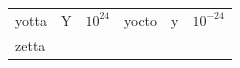 {\begin{tabular}[t]{|l|l|l|l|l|l|}
    
        yotta &
    
    
        Y &
    
    
        
                \begin{math}{10}^{24}\end{math}
               &
    
    
        yocto &
    
    
        y &
    
    
        
                \begin{math}{10}^{-24}\end{math}
     \tabularnewline\cline{1-1}\cline{2-2}\cline{3-3}\cline{4-4}\cline{5-5}\cline{6-6}
    
    
        zetta &
    
    

\end{tabular}}
